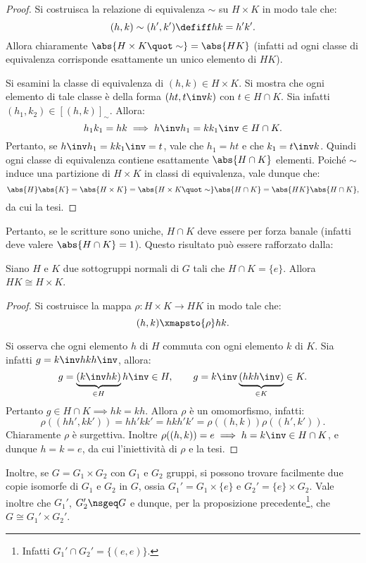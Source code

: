 \documentclass[12pt]{scrartcl}
\begin{document}
	\begin{proof}
		Si costruisca la relazione di equivalenza $\sim$
		su $H \times K$ in modo tale che:
		\[ (h,k) \sim (h',k') \defiff hk=h'k'. \]
		Allora chiaramente $\abs{H \times K \quot \sim} = \abs{HK}$
		(infatti ad ogni classe di equivalenza corrisponde esattamente un unico elemento di $HK$). \bigskip
		
		Si esamini la classe di equivalenza di $(h,k) \in H \times K$. Si
		mostra che ogni elemento di tale classe è della forma
		$(ht,t\inv k)$ con $t \in H \cap K$. Sia infatti $(h_1,k_2) \in
		[(h,k)]_\sim$. Allora:
		\[
			h_1k_1=hk \implies h\inv h_1 = k k_1\inv \in H \cap K.
		\]
		Pertanto, se $h\inv h_1 = k k_1\inv = t$, vale che $h_1=ht$ e che $k_1 = t\inv k$.
		Quindi ogni classe di equivalenza contiene esattamente $\abs{H \cap K}$ elementi.
		Poiché $\sim$ induce una partizione di $H \times K$ in classi
		di equivalenza, vale dunque che:
		\[
			\abs{H} \abs{K} = \abs{H \times K} = \abs{H \times K \quot \sim} \abs{H \cap K} = \abs{HK} \abs{H \cap K},
		\]
		da cui la tesi. 
	\end{proof}

	Pertanto, se le scritture sono uniche, $H \cap K$ deve essere
	per forza banale (infatti deve valere $\abs{H \cap K} = 1$).
	Questo risultato può essere rafforzato dalla:
	
	\begin{proposition}
		Siano $H$ e $K$ due sottogruppi normali di $G$ tali che
		$H \cap K = \{e\}$. Allora $HK \cong H \times K$.
	\end{proposition}

	\begin{proof}
		Si costruisce la mappa $\rho : H \times K \to HK$
		in modo tale che:
		\[ (h,k) \xmapsto{\rho} hk. \]
		
		Si osserva che ogni elemento $h$ di $H$ commuta con
		ogni elemento $k$ di $K$. Sia infatti $g = k\inv hkh\inv$, allora:
		\[
			g = \underbrace{(k\inv hk)}_{\in H} h\inv \in H, \qquad g = k\inv \underbrace{(hkh\inv)}_{\in K} \in K.
		\]
		Pertanto $g \in H \cap K \implies hk=kh$. Allora $\rho$
		è un omomorfismo, infatti:
		\[
			\rho((hh',kk')) = hh'kk' = hkh'k' = \rho((h,k)) \rho((h',k')).
		\]
		Chiaramente $\rho$ è surgettiva. Inoltre $\rho((h,k)) = e \implies h = k\inv \in H \cap K$,
		e dunque $h = k = e$, da cui l'iniettività di $\rho$
		e la tesi.
	\end{proof}
	
	
	Inoltre, se $G = G_1 \times G_2$ con $G_1$ e $G_2$ gruppi, si possono trovare
	facilmente due copie isomorfe di $G_1$ e $G_2$ in $G$, ossia $G_1' = G_1 \times \{e\}$ e $G_2' = \{e\} \times G_2$.
	Vale inoltre che $G_1'$, $G_2' \nsgeq G$ e dunque,
	per la proposizione precedente\footnote{Infatti $G_1' \cap G_2' = \{(e,e)\}$.}, che
	$G \cong G_1' \times G_2'$. \bigskip
\end{document}
